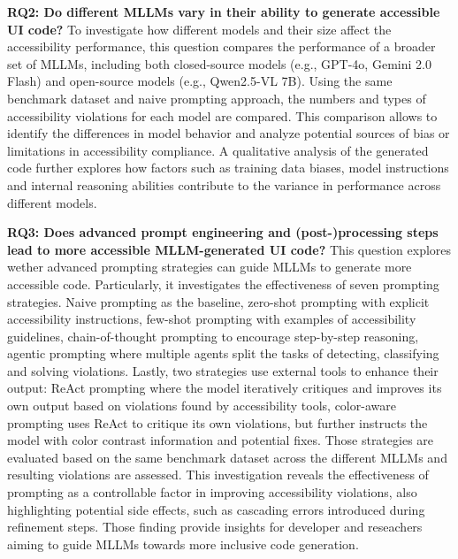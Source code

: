 \textbf{RQ2: Do different MLLMs vary in their ability to generate accessible UI code?}
To investigate how different models and their size affect the 
accessibility performance, this question compares the performance of 
a broader set of MLLMs, including both closed-source models
(e.g., GPT-4o, Gemini 2.0 Flash) and open-source
models (e.g., Qwen2.5-VL 7B). Using the same benchmark dataset and 
naive prompting approach, the numbers and types of accessibility 
violations for each model are compared. This comparison allows to
identify the differences in model behavior and analyze potential 
sources of bias or limitations in accessibility compliance. A
qualitative analysis of the generated code further explores how 
factors such as training data biases, model instructions and 
internal reasoning abilities contribute to the variance in
performance across different models.\newline

\textbf{RQ3: Does advanced prompt engineering and (post-)processing steps lead to more accessible MLLM-generated UI
code?}
This question explores wether advanced prompting strategies can guide 
MLLMs to generate more accessible code. Particularly, it investigates
the effectiveness of seven prompting strategies. Naive prompting as the
baseline, zero-shot prompting with explicit accessibility instructions,
few-shot prompting with examples of accessibility guidelines,
chain-of-thought prompting to encourage step-by-step reasoning, 
agentic prompting where multiple agents split the tasks of
detecting, classifying and solving violations. 
Lastly, two strategies use external tools to enhance their output:
ReAct prompting where the model iteratively critiques and improves 
its own output based on violations found by accessibility tools, 
color-aware prompting uses ReAct to critique its own violations, but 
further instructs the model with color contrast information and 
potential fixes. Those strategies are evaluated based on the same 
benchmark dataset across the different MLLMs and resulting violations 
are assessed. This investigation reveals the effectiveness of prompting 
as a controllable factor in improving accessibility violations, 
also highlighting potential side effects, such as cascading 
errors introduced during refinement steps. Those finding provide 
insights for developer and reseachers aiming to guide MLLMs towards 
more inclusive code generation.\newline

